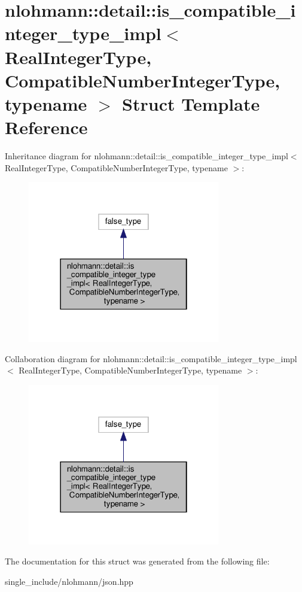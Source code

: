\hypertarget{structnlohmann_1_1detail_1_1is__compatible__integer__type__impl}{}\section{nlohmann\+:\+:detail\+:\+:is\+\_\+compatible\+\_\+integer\+\_\+type\+\_\+impl$<$ Real\+Integer\+Type, Compatible\+Number\+Integer\+Type, typename $>$ Struct Template Reference}
\label{structnlohmann_1_1detail_1_1is__compatible__integer__type__impl}


Inheritance diagram for nlohmann\+:\+:detail\+:\+:is\+\_\+compatible\+\_\+integer\+\_\+type\+\_\+impl$<$ Real\+Integer\+Type, Compatible\+Number\+Integer\+Type, typename $>$\+:\nopagebreak
\begin{figure}[H]
\begin{center}
\leavevmode
\includegraphics[width=238pt]{structnlohmann_1_1detail_1_1is__compatible__integer__type__impl__inherit__graph}
\end{center}
\end{figure}


Collaboration diagram for nlohmann\+:\+:detail\+:\+:is\+\_\+compatible\+\_\+integer\+\_\+type\+\_\+impl$<$ Real\+Integer\+Type, Compatible\+Number\+Integer\+Type, typename $>$\+:\nopagebreak
\begin{figure}[H]
\begin{center}
\leavevmode
\includegraphics[width=238pt]{structnlohmann_1_1detail_1_1is__compatible__integer__type__impl__coll__graph}
\end{center}
\end{figure}


The documentation for this struct was generated from the following file\+:\begin{DoxyCompactItemize}
\item 
single\+\_\+include/nlohmann/json.\+hpp\end{DoxyCompactItemize}
